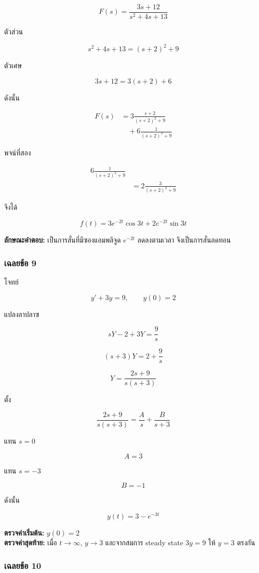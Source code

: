 \[
F(s)=\frac{3s+12}{s^2+4s+13}
\]

ตัวส่วน

\[
s^2+4s+13=(s+2)^2+9
\]

ตัวเศษ

\[
3s+12=3(s+2)+6
\]

ดังนั้น

\[
\begin{aligned}
    F(s)&=3\frac{s+2}{(s+2)^2+9}\\
    &\quad +6\frac{1}{(s+2)^2+9}
\end{aligned}
\]

พจน์ที่สอง

\[
\begin{aligned}
    6\frac{1}{(s+2)^2+9}&\\
    &=2\frac{3}{(s+2)^2+9}
\end{aligned}
\]

จึงได้

\[
\boxed{f(t)=3e^{-2t}\cos3t+2e^{-2t}\sin3t}
\]

\textbf{ลักษณะคำตอบ:} เป็นการสั่นที่มีซองแอมพลิจูด $e^{-2t}$ ลดลงตามเวลา จึงเป็นการสั่นลดทอน

\subsubsection{เฉลยข้อ 9}

โจทย์

\[
y'+3y=9,\qquad y(0)=2
\]

แปลงลาปลาซ

\[
sY-2+3Y=\frac{9}{s}
\]

\[
(s+3)Y=2+\frac{9}{s}
\]

\[
Y=\frac{2s+9}{s(s+3)}
\]

ตั้ง

\[
\frac{2s+9}{s(s+3)}=\frac{A}{s}+\frac{B}{s+3}
\]

แทน $s=0$

\[
A=3
\]

แทน $s=-3$

\[
B=-1
\]

ดังนั้น

\[
\boxed{y(t)=3-e^{-3t}}
\]

\textbf{ตรวจค่าเริ่มต้น:} $y(0)=2$\\
\textbf{ตรวจค่าสุดท้าย:} เมื่อ $t\to\infty$, $y\to3$ และจากสมการ steady state $3y=9$ ให้ $y=3$ ตรงกัน

\subsubsection{เฉลยข้อ 10}

